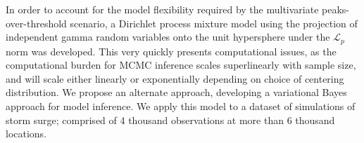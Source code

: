In order to account for the model flexibility required by the multivariate
    peaks-over-threshold scenario, a Dirichlet process mixture model using
    the projection of independent gamma random variables onto the unit 
    hypersphere under the $\mathcal{L}_p$ norm was developed.  This very
    quickly presents computational issues, as the computational burden for
    MCMC inference scales superlinearly with sample size, and will scale
    either linearly or exponentially depending on choice of centering 
    distribution. We propose an alternate approach, developing a 
    variational Bayes approach for model inference.  We apply this model
    to a dataset of simulations of storm surge; comprised of 4 thousand
    observations at more than 6 thousand locations.
    
